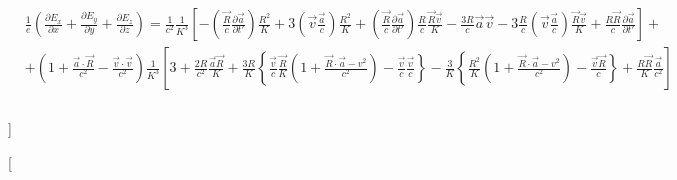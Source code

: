\documentclass[11pt]{article}
\begin{document}
\begin{align}
  & \frac{1}{e}\left( \frac{\partial {{E}_{x}}}{\partial x}+\frac{\partial {{E}_{y}}}{\partial y}+\frac{\partial {{E}_{z}}}{\partial z} \right)=\frac{1}{{{c}^{2}}}\frac{1}{{{K}^{3}}}\left[ -\left( \frac{\overrightarrow{R}}{c}\frac{\partial \overrightarrow{a}}{\partial t'} \right)\frac{{{R}^{2}}}{K}+3\left( \overrightarrow{v}\frac{\overrightarrow{a}}{c} \right)\frac{{{R}^{2}}}{K}+\left( \frac{\overrightarrow{R}}{c}\frac{\partial \overrightarrow{a}}{\partial t'} \right)\frac{R}{c}\frac{\overrightarrow{R}\overrightarrow{v}}{K}-\frac{3R}{c}\overrightarrow{a}\overrightarrow{v}-3\frac{R}{c}\left( \overrightarrow{v}\frac{\overrightarrow{a}}{c} \right)\frac{\overrightarrow{R}\overrightarrow{v}}{K}+\frac{R\overrightarrow{R}}{c}\frac{\partial \overrightarrow{a}}{\partial t'} \right]+ \\ 
 & +\left( 1+\frac{\overrightarrow{a}\cdot \overrightarrow{R}}{{{c}^{2}}}-\frac{\overrightarrow{v}\cdot \overrightarrow{v}}{{{c}^{2}}} \right)\frac{1}{{{K}^{3}}}\left[ 3+\frac{2R}{{{c}^{2}}}\frac{\overrightarrow{a}\overrightarrow{R}}{K}+\frac{3R}{K}\left\{ \frac{\overrightarrow{v}}{c}\frac{\overrightarrow{R}}{K}\left( 1+\frac{\overrightarrow{R}\cdot \overrightarrow{a}-{{v}^{2}}}{{{c}^{2}}} \right)-\frac{\overrightarrow{v}}{c}\frac{\overrightarrow{v}}{c} \right\}-\frac{3}{K}\left\{ \frac{{{R}^{2}}}{K}\left( 1+\frac{\overrightarrow{R}\cdot \overrightarrow{a}-{{v}^{2}}}{{{c}^{2}}} \right)-\frac{\overrightarrow{v}\overrightarrow{R}}{c} \right\}+\frac{R\overrightarrow{R}}{K}\frac{\overrightarrow{a}}{{{c}^{2}}} \right] \\ 
 &  \\ 
\end{align}

{]}

{[}
\end{document}
